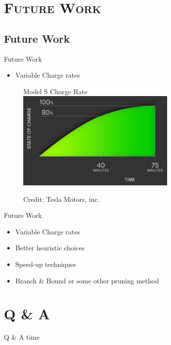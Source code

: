 \section{\scshape Future Work}
\subsection{Future Work}
\begin{frame}{Future Work}
\begin{itemize}
\item Variable Charge rates
\end{itemize}
\begin{figure}[h!]
  \centering
  Model S Charge Rate
    \includegraphics[width=0.7\textwidth]{images/chargerate}
  
      \tiny Credit: Tesla Motors, inc.
\end{figure}
\vspace{10cm}
\end{frame}

\begin{frame}{Future Work}
\begin{itemize}
\item Variable Charge rates
\item Better heuristic choices
\item Speed-up techniques
\item Branch \& Bound or some other pruning method
\end{itemize}
\vspace{10cm}
\end{frame}

\section{\scshape Q \& A}
\begin{frame}{Q \& A time}
\end{frame}
